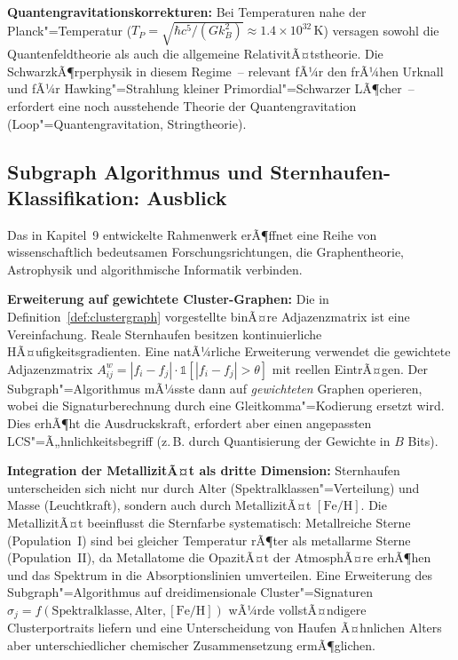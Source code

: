 ﻿\documentclass[a4paper,12pt]{article}
\theoremstyle{definition}
\begin{document}
\textbf{Quantengravitationskorrekturen:} Bei Temperaturen nahe der
Planck"=Temperatur ($T_P = \sqrt{\hbar c^5 / (G k_B^2)} \approx 1.4 \times 10^{32}\,\text{K}$)
versagen sowohl die Quantenfeldtheorie als auch die allgemeine
RelativitÃ¤tstheorie. Die SchwarzkÃ¶rperphysik in diesem Regime~--
relevant fÃ¼r den frÃ¼hen Urknall und fÃ¼r Hawking"=Strahlung kleiner
Primordial"=Schwarzer LÃ¶cher~-- erfordert eine noch ausstehende Theorie
der Quantengravitation (Loop"=Quantengravitation, Stringtheorie).

\subsection{Subgraph Algorithmus und Sternhaufen-Klassifikation: Ausblick}

Das in Kapitel~9 entwickelte Rahmenwerk erÃ¶ffnet eine Reihe von
wissenschaftlich bedeutsamen Forschungsrichtungen, die Graphentheorie,
Astrophysik und algorithmische Informatik verbinden.

\textbf{Erweiterung auf gewichtete Cluster-Graphen:}
Die in Definition~\ref{def:clustergraph} vorgestellte binÃ¤re
Adjazenzmatrix ist eine Vereinfachung. Reale Sternhaufen besitzen
kontinuierliche HÃ¤ufigkeitsgradienten. Eine natÃ¼rliche Erweiterung
verwendet die gewichtete Adjazenzmatrix
$A^w_{ij} = |f_i - f_j| \cdot \mathbb{1}[|f_i - f_j| > \theta]$
mit reellen EintrÃ¤gen. Der Subgraph"=Algorithmus mÃ¼sste dann auf
\emph{gewichteten} Graphen operieren, wobei die Signaturberechnung
durch eine Gleitkomma"=Kodierung ersetzt wird. Dies erhÃ¶ht die
Ausdruckskraft, erfordert aber einen angepassten LCS"=Ã„hnlichkeitsbegriff
(z.\,B. durch Quantisierung der Gewichte in $B$ Bits).

\textbf{Integration der MetallizitÃ¤t als dritte Dimension:}
Sternhaufen unterscheiden sich nicht nur durch Alter (Spektralklassen"=Verteilung)
und Masse (Leuchtkraft), sondern auch durch MetallizitÃ¤t $[\text{Fe/H}]$.
Die MetallizitÃ¤t beeinflusst die Sternfarbe systematisch:
Metallreiche Sterne (Population~I) sind bei gleicher Temperatur
rÃ¶ter als metallarme Sterne (Population~II), da Metallatome die
OpazitÃ¤t der AtmosphÃ¤re erhÃ¶hen und das Spektrum in die Absorptionslinien
umverteilen. Eine Erweiterung des Subgraph"=Algorithmus auf
dreidimensionale Cluster"=Signaturen $\sigma_j = f(\text{Spektralklasse}, \text{Alter}, [\text{Fe/H}])$
wÃ¼rde vollstÃ¤ndigere Clusterportraits liefern und eine Unterscheidung
von Haufen Ã¤hnlichen Alters aber unterschiedlicher chemischer Zusammensetzung
ermÃ¶glichen.
\end{document}
